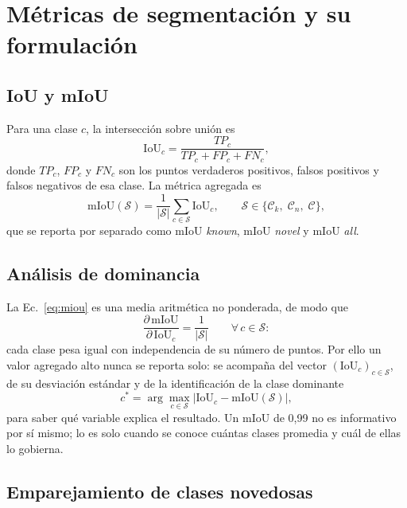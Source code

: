 \section{Métricas de segmentación y su formulación}
\label{sec:metricas}

\subsection{IoU y mIoU}

Para una clase $c$, la intersección sobre unión es
\begin{equation}
\mathrm{IoU}_c=\frac{TP_c}{TP_c+FP_c+FN_c},
\label{eq:iou}
\end{equation}
donde $TP_c$, $FP_c$ y $FN_c$ son los puntos verdaderos positivos, falsos
positivos y falsos negativos de esa clase. La métrica agregada es
\begin{equation}
\mathrm{mIoU}(\mathcal{S})=\frac{1}{|\mathcal{S}|}\sum_{c\in\mathcal{S}}\mathrm{IoU}_c,
\qquad
\mathcal{S}\in\{\mathcal{C}_k,\;\mathcal{C}_n,\;\mathcal{C}\},
\label{eq:miou}
\end{equation}
que se reporta por separado como mIoU \emph{known}, mIoU \emph{novel} y mIoU
\emph{all}.

\subsection{Análisis de dominancia}

La Ec.~\eqref{eq:miou} es una media aritmética no ponderada, de modo que
\begin{equation}
\frac{\partial\,\mathrm{mIoU}}{\partial\,\mathrm{IoU}_c}=\frac{1}{|\mathcal{S}|}
\qquad \forall\, c\in\mathcal{S}:
\label{eq:dominancia}
\end{equation}
cada clase pesa igual con independencia de su número de puntos. Por ello un valor
agregado alto nunca se reporta solo: se acompaña del vector
$(\mathrm{IoU}_c)_{c\in\mathcal{S}}$, de su desviación estándar y de la
identificación de la clase dominante
\begin{equation}
c^{*}=\arg\max_{c\in\mathcal{S}}\bigl|\mathrm{IoU}_c-\mathrm{mIoU}(\mathcal{S})\bigr|,
\label{eq:dominante}
\end{equation}
para saber qué variable explica el resultado. Un mIoU de 0,99 no es informativo
por sí mismo; lo es solo cuando se conoce cuántas clases promedia y cuál de ellas
lo gobierna.

\subsection{Emparejamiento de clases novedosas}

